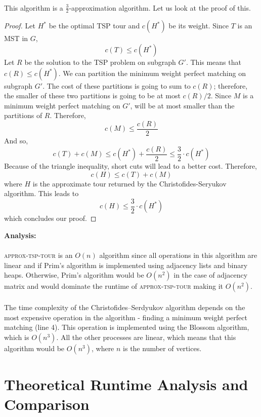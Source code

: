 \documentclass[11pt]{article}
\begin{document}
  \paragraph{}
  This algorithm is a $\frac{3}{2}$-approximation algorithm. Let us look at the proof of this. 
  \begin{proof}
    Let $H^*$ be the optimal TSP tour and $c(H^*)$ be its weight. 
    Since $T$ is an MST in $G$, \[c(T) \leq c(H^*)\] 
    Let $R$ be the solution to the TSP problem on subgraph $G'$. This means that $c(R) \leq c(H^*)$. We can partition the minimum weight perfect matching 
    on subgraph $G'$. The cost of these partitions is going to sum to $c(R)$; therefore, the smaller of these two partitions is 
    going to be at most $c(R)/2$. Since $M$ is a minimum weight perfect matching on $G'$, will be at most smaller than the partitions of $R$. 
    Therefore, \[c(M) \leq \frac{c(R)}{2}\]
    And so, \[c(T) + c(M) \leq c(H^*) + \frac{c(R)}{2} \leq \frac{3}{2} \cdot c(H^*)\]
    Because of the triangle inequality, short cuts will lead to a better cost. Therefore, 
    \[c(H) \leq c(T) + c(M) \] where $H$ is the approximate tour returned by the Christofides-Seryukov algorithm. This leads to
    \[c(H) \leq \frac{3}{2} \cdot c(H^*)\]
    which concludes our proof.
  \end{proof}

  \textbf{Analysis:} \paragraph{}
  \textsc{approx-tsp-tour} is an $O(n)$ algorithm since all operations in this algorithm are linear and if Prim's algorithm is 
  implemented using adjacency lists and binary heaps. Otherwise, Prim's algorithm would be $O(n^2)$ in the 
  case of adjacency matrix and would dominate the runtime of \textsc{approx-tsp-tour} making it $O(n^2)$.
  \paragraph{} The time complexity of the Christofides–Serdyukov algorithm depends on the most expensive operation in the 
  algorithm - finding a minimum weight perfect matching (line 4). This operation is implemented using the Blossom algorithm, which is $O(n^3)$. All the other 
  processes are linear, which means that this algorithm would be $O(n^3)$, where $n$ is the number of vertices. 

  \section{Theoretical Runtime Analysis and Comparison}
\end{document}
